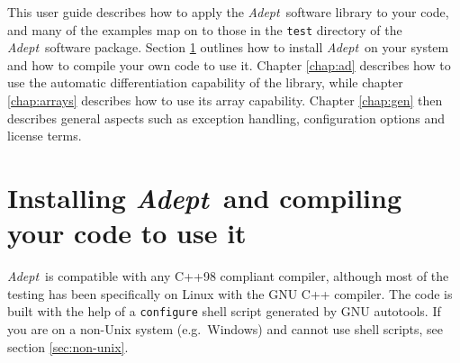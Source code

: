 \documentclass[a4,oneside]{book}
\def\codesize{\small}
\def\Adept{\emph{Adept}}
\def\code#1{{\codesize\texttt{#1}}}
\begin{document}
This user guide describes how to apply the \Adept\ software library to
your code, and many of the examples map on to those in the \code{test}
directory of the \Adept\ software package.  Section
\ref{sec:installing} outlines how to install \Adept\ on your system
and how to compile your own code to use it. Chapter \ref{chap:ad}
describes how to use the automatic differentiation capability of the
library, while chapter \ref{chap:arrays} describes how to use its
array capability. Chapter \ref{chap:gen} then describes general
aspects such as exception handling, configuration options and license
terms.

\section{Installing \Adept\ and compiling your code to use it}
\label{sec:installing}
\Adept\ is compatible with any C++98 compliant compiler,
although most of the testing has been specifically on Linux with the
GNU C++ compiler. The code is built with the help of a
\code{configure} shell script generated by GNU autotools.  If you are
on a non-Unix system (e.g.\ Windows) and cannot use shell scripts, see
section \ref{sec:non-unix}.
\end{document}
